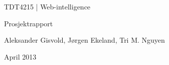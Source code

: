 \begin{titlepage}
\begin{center}
\vspace*{1in}
{\LARGE TDT4215 | Web-intelligence}
\par
\vspace{1in}
{\LARGE Prosjektrapport}
\par
\vspace{1in}
{\LARGE }
\par
\vfill
\par
\vspace{0.5in}
Aleksander Gisvold, Jørgen Ekeland, Tri M. Nguyen
\par
April 2013
\end{center}
\end{titlepage}
